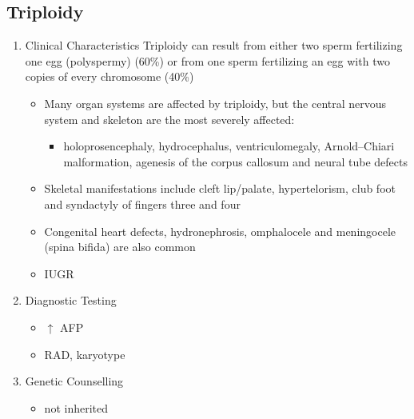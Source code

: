 \documentclass[12pt]{scrartcl}
\begin{document}
\subsection{Triploidy}
\label{sec:org006ba7f}
\begin{enumerate}
\item Clinical Characteristics
\label{sec:orgb16235f}
Triploidy can result from either two sperm fertilizing one egg
(polyspermy) (60\%) or from one sperm fertilizing an egg with two
copies of every chromosome (40\%)

\begin{itemize}
\item Many organ systems are affected by triploidy, but the central
nervous system and skeleton are the most severely affected:
\begin{itemize}
\item holoprosencephaly, hydrocephalus, ventriculomegaly, Arnold–Chiari
malformation, agenesis of the corpus callosum and neural tube
defects
\end{itemize}
\item Skeletal manifestations include cleft lip/palate, hypertelorism,
club foot and syndactyly of fingers three and four
\item Congenital heart defects, hydronephrosis, omphalocele and
meningocele (spina bifida) are also common
\item IUGR
\end{itemize}

\item Diagnostic Testing
\label{sec:org1d3eb08}
\begin{itemize}
\item \(\uparrow\) AFP
\item RAD, karyotype
\end{itemize}
\item Genetic Counselling
\label{sec:org7806b70}
\begin{itemize}
\item not inherited
\end{itemize}
\end{enumerate}
\end{document}
